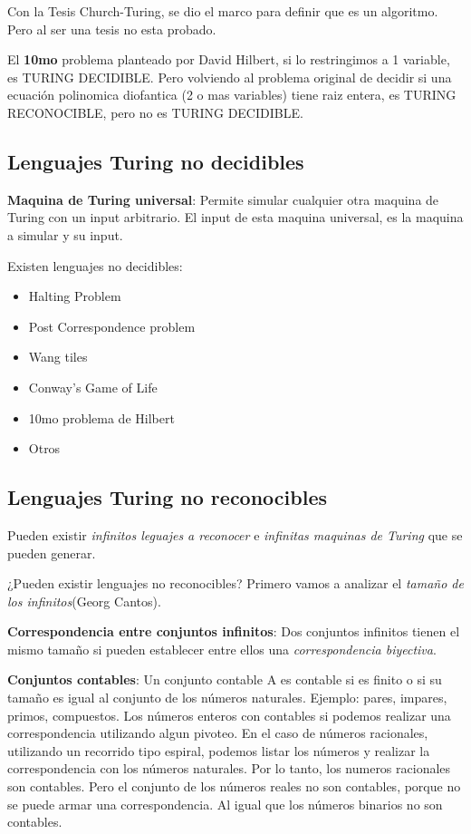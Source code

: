 \documentclass{article}
\begin{document}
Con la Tesis Church-Turing, se dio el marco para definir que es un algoritmo. Pero al ser una tesis no esta probado.

El \textbf{10mo} problema planteado por David Hilbert, si lo restringimos a 1 variable, es TURING DECIDIBLE.
Pero volviendo al problema original de decidir si una ecuación polinomica diofantica (2 o mas variables) tiene raiz entera,
es TURING RECONOCIBLE, pero no es TURING DECIDIBLE. 

\newpage
\subsection{Lenguajes Turing no decidibles}

\textbf{Maquina de Turing universal}: Permite simular cualquier otra maquina de Turing con un input arbitrario.
El input de esta maquina universal, es la maquina a simular y su input.

Existen lenguajes no decidibles:
\begin{itemize}
    \item Halting Problem
    \item Post Correspondence problem
    \item Wang tiles
    \item Conway's Game of Life
    \item 10mo problema de Hilbert
    \item Otros
\end{itemize}

\newpage
\subsection{Lenguajes Turing no reconocibles}

Pueden existir \textit{infinitos leguajes a reconocer} e \textit{infinitas maquinas de Turing} que se pueden generar.

¿Pueden existir lenguajes no reconocibles? Primero vamos a analizar el \textit{tamaño de los infinitos}(Georg Cantos).

\textbf{Correspondencia entre conjuntos infinitos}: Dos conjuntos infinitos tienen el mismo tamaño 
si pueden establecer entre ellos una \textit{correspondencia biyectiva}.

\textbf{Conjuntos contables}: Un conjunto contable A es contable si es finito o si su tamaño es igual
al conjunto de los números naturales. Ejemplo: pares, impares, primos, compuestos. Los números enteros
con contables si podemos realizar una correspondencia utilizando algun pivoteo. En el caso de 
números racionales, utilizando un recorrido tipo espiral, podemos listar los números y realizar
la correspondencia con los números naturales. Por lo tanto, los numeros racionales son contables.
Pero el conjunto de los números reales no son contables, porque no se puede armar una correspondencia.
Al igual que los números binarios no son contables.
\end{document}
